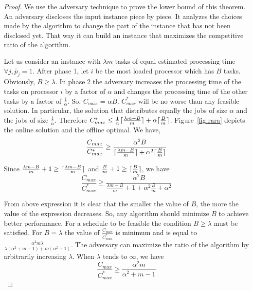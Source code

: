 \begin{proof}
  We use the adversary technique to prove the lower bound of this
  theorem. An adversary discloses the input instance piece by
  piece. It analyzes the choices made by the algorithm to change the
  part of the instance that has not been disclosed yet. That way it
  can build an instance that maximizes the competitive ratio of the
  algorithm.
 
  Let us consider an instance with $\lambda m$ tasks of equal
  estimated processing time $\forall j, \tilde{p_j} = 1$. After phase
  1, let $i$ be the most loaded processor which has $B$
  tasks. Obviously, $B \geq \lambda$. In phase 2 the adversary
  increases the processing time of the tasks on processor $i$ by a
  factor of $\alpha$ and changes the processing time of the other
  tasks by a factor of $\frac{1}{\alpha}$. So, $ C_{max}$ = $\alpha
  B$. ${C^{*}_{max}}$ will be no worse than any feasible solution. In
  particular, the solution that distributes equally the jobs of size
  $\alpha$ and the jobs of size $\frac{1}{\alpha}$. Therefore
  ${C^{*}_{max}} \leq \frac{1}{\alpha }\lceil\frac{\lambda m - B
    }{m}\rceil+ \alpha\lceil\frac{B}{m}\rceil $.  Figure~\ref{fig:rara} depicts
  the online solution and the offline optimal. We have,
 \begin{equation}\nonumber
   \frac{C_{max}}{C^{*}_{max}}
   \geq \frac{\alpha^{2} B  }{\lceil\frac{
        \lambda m - B }{m}\rceil+\alpha^2\lceil\frac{B}{m}\rceil}
 \end{equation}
   
 Since $\frac{ \lambda m - B }{m} +1 \geq\lceil\frac{ \lambda m - B
   }{m}\rceil$ and $\frac{B}{m}+1\geq\lceil\frac{B}{m}\rceil$, we have
 \begin{equation}\nonumber
   \frac{C_{max}}{C^{*}_{max}}
   \geq \frac{\alpha^{2} B  }{\frac{
       \lambda m - B }{m}+1+\alpha^2\frac{B}{m}+\alpha^{2}}
 \end{equation}
 
 From above expression it is clear that the smaller the value of $B$, the more the
 value of the expression decreases. So, any algorithm should minimize
 $B$ to achieve better performance.  For a schedule to be feasible the
 condition $B \geq \lambda$ must be satisfied. For $B = \lambda$ the
 value of $\frac{C_{max}}{C^{*}_{max}}$ is minimum and is equal to
 $\frac{\alpha^{2} m \lambda }{\lambda(\alpha^{2}+m-1)+
   m(\alpha^{2}+1)}$. The adversary can maximize the ratio of the
 algorithm by arbitrarily increasing $\lambda$. When $\lambda$ tends
 to $\infty$, we have
 \begin{equation}\nonumber
       \frac{C_{max}}{C^{*}_{max}}
       \geq \frac{\alpha^{2}m  }{\alpha^{2}+m-1}
     \end{equation}
 


\end{proof}
